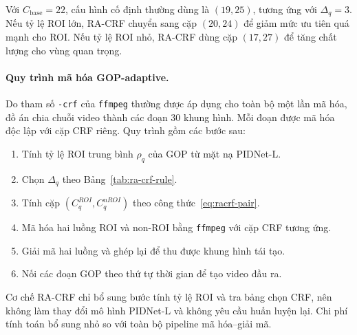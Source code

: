 Với $C_{\text{base}}=22$, cấu hình cố định thường dùng là $(19,25)$, tương ứng với $\Delta_q=3$. Nếu tỷ lệ ROI lớn, RA-CRF chuyển sang cặp $(20,24)$ để giảm mức ưu tiên quá mạnh cho ROI. Nếu tỷ lệ ROI nhỏ, RA-CRF dùng cặp $(17,27)$ để tăng chất lượng cho vùng quan trọng.

\paragraph{Quy trình mã hóa GOP-adaptive.}
Do tham số \texttt{-crf} của \texttt{ffmpeg} thường được áp dụng cho toàn bộ một lần mã hóa, đồ án chia chuỗi video thành các đoạn 30 khung hình. Mỗi đoạn được mã hóa độc lập với cặp CRF riêng. Quy trình gồm các bước sau:

\begin{enumerate}
  \item Tính tỷ lệ ROI trung bình $\rho_q$ của GOP từ mặt nạ PIDNet-L.
  \item Chọn $\Delta_q$ theo Bảng~\ref{tab:ra-crf-rule}.
  \item Tính cặp $(C^{ROI}_q, C^{nROI}_q)$ theo công thức~\eqref{eq:racrf-pair}.
  \item Mã hóa hai luồng ROI và non-ROI bằng \texttt{ffmpeg} với cặp CRF tương ứng.
  \item Giải mã hai luồng và ghép lại để thu được khung hình tái tạo.
  \item Nối các đoạn GOP theo thứ tự thời gian để tạo video đầu ra.
\end{enumerate}

Cơ chế RA-CRF chỉ bổ sung bước tính tỷ lệ ROI và tra bảng chọn CRF, nên không làm thay đổi mô hình PIDNet-L và không yêu cầu huấn luyện lại. Chi phí tính toán bổ sung nhỏ so với toàn bộ pipeline mã hóa--giải mã.